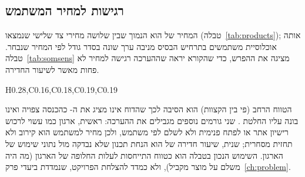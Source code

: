 \subsection{רגישות למחיר המשתמש}\label{sec:somsens}
המחיר של  הוא הנמוך שבין שלושה מחירי צד שלישי שנמצאו (טבלה~\ref{tab:products}); אותה אוכלוסיית משתמשים בתרחיש הבסיס מניבה ערך שונה בסדר גודל לפי
המחיר שנבחר. טבלה~\ref{tab:somsens} מציגה את ההפרש, כדי שהקורא יראה שההערכה רגישה למחיר לא פחות מאשר לשיעור החדירה.
\begin{table}[!htbp]
\centering
\caption[רגישות ה-SOM למחיר המשתמש]{רגישות ה- למחיר משתמש לחודש, בתרחיש הבסיס ( משתמשים בשלב א',  בשלב ב'). מחירים: \cite{manualto2026pricing}; הם דיווחי צד שלישי שלא אומתו מול היצרנים. ערך שנתי \mth{=} משתמשים \mth{\times} מחיר }\label{tab:somsens}
\begin{pctable}{H{0.28},C{0.16},C{0.18},C{0.19},C{0.19}}
\end{pctable}
\end{table}
הטווח הרחב (פי  בין הקצוות) הוא הסיבה לכך שהדוח אינו מציג את ה- כהכנסה צפויה ואינו בונה עליו החלטת
. שני גורמים נוספים מגבילים את ההערכה: ראשית, ארגון כמו  עשוי לרכוש רישיון אתר או לפתח פנימית ולא לשלם
לפי משתמש, ולכן מחיר למשתמש הוא קירוב ולא תחזית מסחרית; שנית, שיעור חדירה של  הוא הנחת תכנון שלא נבדקה מול
נתוני שימוש של הארגון. השימוש הנכון בטבלה הוא כטווח התייחסות לעלות החלופה של הארגון (מה היה משלם על מוצר מקביל), ולא כמדד להצלחת
הפרויקט, שנמדדת ביעדי פרק~\ref{ch:problem}.

